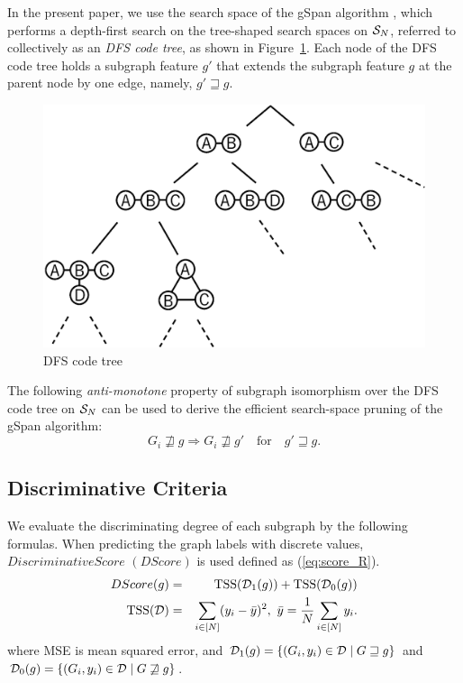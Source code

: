 In the present paper, we use the search space of the gSpan algorithm \cite{Yan:2002},
which performs a depth-first search on the tree-shaped search spaces on $\S_N$,
referred to collectively as an \textit{DFS code tree}, as shown in Figure~\ref{fig:search_tree}.
Each node of the DFS code tree holds a subgraph feature $g'$ that
extends the subgraph feature $g$ at the parent node by one edge, namely, $ g' \sqsupseteq g $.

\begin{figure}[t]
  \centering
  \includegraphics[width=0.5\linewidth]{img/search_tree.eps}
  \caption{DFS code tree}
  \label{fig:search_tree}
\end{figure}

The following \textit{anti-monotone} property of
subgraph isomorphism over the DFS code tree on $\S_N$ can be used to
derive the efficient search-space pruning of the gSpan algorithm:
\begin{equation}
  \label{eq:propSubgraph}
  G_i \not \sqsupseteq g \Rightarrow G_i \not\sqsupseteq g'
  \quad \text{for} \quad
  g' \sqsupseteq g . %
\end{equation}

\subsection{Discriminative Criteria}
\label{sec:criteria}
We evaluate the discriminating degree of each subgraph by the following formulas.
When predicting the graph labels with discrete values, $Discriminative Score$ $(DScore)$  is used defined as (\ref{eq:score_R}).
\begin{eqnarray}
  \label{eq:score_R}
  DScore(g) &=& \tss(\D_1(g)) + \tss(\D_0(g)) \\
  \tss(\D) &=& \sum_{i \in [N]}
  (y_i - \bar{y})^2, \,\, \bar{y} = \frac{1}{N} \sum_{i \in [N]} y_i. \nonumber
\end{eqnarray}
where MSE is mean squared error, and
$\D_1(g) = \{ (G_i, y_i) \in \D \mid G \sqsupseteq g \} $ and
$\D_0(g) = \{ (G_i, y_i) \in \D \mid G \not\sqsupseteq g \} $.

